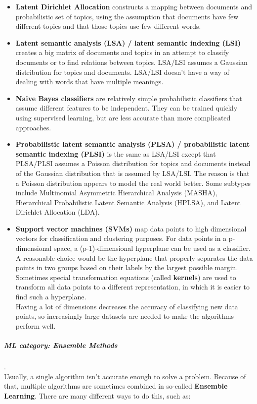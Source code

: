 \begin{itemize}
	\item \textbf{Latent Dirichlet Allocation}\cite{Blei03}
		constructs a mapping between documents and probabilistic set of topics, using the assumption that documents have few different topics and that those topics use few different words.
	\item \textbf{Latent semantic analysis (LSA) / latent semantic indexing (LSI)}
		creates a big matrix of documents and topics in an attempt to classify documents or to find relations between topics. LSA/LSI assumes a Gaussian distribution for topics and documents. LSA/LSI doesn't have a way of dealing with words that have multiple meanings.
	\item \textbf{Naive Bayes classifiers}
		are relatively simple probabilistic classifiers that assume different features to be independent. They can be trained quickly using supervised learning, but are less accurate than more complicated approaches.
	\item \textbf{Probabilistic latent semantic analysis (PLSA) / probabilistic latent semantic indexing (PLSI)}
		is the same as LSA/LSI except that PLSA/PLSI assumes a Poisson distribution for topics and documents instead of the Gaussian distribution that is assumed by LSA/LSI. The reason is that a Poisson distribution appears to model the real world better. Some subtypes include Multinomial Asymmetric Hierarchical Analysis (MASHA), Hierarchical Probabilistic Latent Semantic Analysis (HPLSA), and Latent Dirichlet Allocation (LDA).
	\item \textbf{Support vector machines (SVMs)}
		map data points to high dimensional vectors for classification and clustering purposes. For data points in a p-dimensional space, a (p-1)-dimensional hyperplane can be used as a classifier. A reasonable choice would be the hyperplane that properly separates the data points in two groups based on their labels by the largest possible margin. Sometimes special transformation equations (called \textbf{kernels}) are used to transform all data points to a different representation, in which it is easier to find such a hyperplane.\\
		Having a lot of dimensions decreases the accuracy of classifying new data points, so increasingly large datasets are needed to make the algorithms perform well.
\end{itemize}

\subparagraph{ML category: Ensemble Methods}
.\\
Usually, a single algorithm isn't accurate enough to solve a problem. Because of that, multiple algorithms are sometimes combined in so-called \textbf{Ensemble Learning}. There are many different ways to do this, such as:

